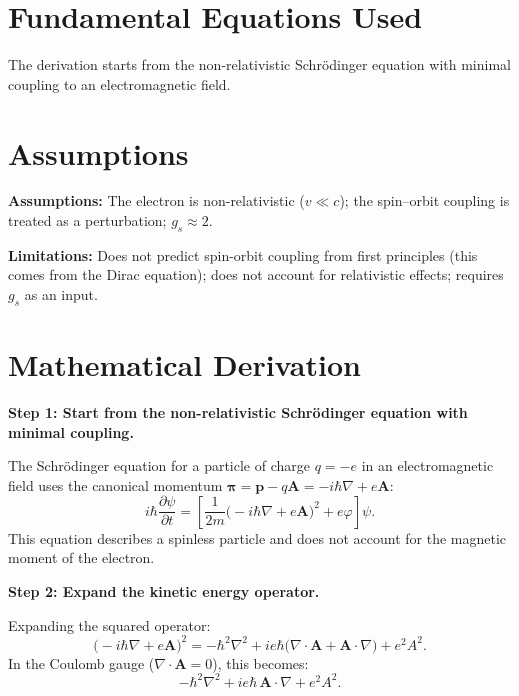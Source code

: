 \section*{Fundamental Equations Used}

The derivation starts from the non-relativistic Schr\"odinger equation with minimal coupling to an electromagnetic field.

\section*{Assumptions}

\textbf{Assumptions:} The electron is non-relativistic ($v \ll c$); the spin--orbit coupling is treated as a perturbation; $g_{s} \approx 2$.


\textbf{Limitations:} Does not predict spin-orbit coupling from first principles (this comes from the Dirac equation); does not account for relativistic effects; requires $g_{s}$ as an input.


\section*{Mathematical Derivation}

\textbf{Step 1: Start from the non-relativistic Schr\"odinger equation with minimal coupling.}

The Schr\"odinger equation for a particle of charge $q = -e$ in an electromagnetic field uses the canonical momentum $\boldsymbol{\pi} = \mathbf{p} - q\mathbf{A} = -i\hbar\nabla + e\mathbf{A}$:
\begin{equation}
i\hbar\frac{\partial\psi}{\partial t} = \left[\frac{1}{2m}\bigl(-i\hbar\nabla + e\mathbf{A}\bigr)^{2} + e\varphi\right]\psi.
\end{equation}
This equation describes a spinless particle and does not account for the magnetic moment of the electron.

\textbf{Step 2: Expand the kinetic energy operator.}

Expanding the squared operator:
\begin{equation}
\bigl(-i\hbar\nabla + e\mathbf{A}\bigr)^{2} = -\hbar^{2}\nabla^{2} + ie\hbar\bigl(\nabla\cdot\mathbf{A} + \mathbf{A}\cdot\nabla\bigr) + e^{2}A^{2}.
\end{equation}
In the Coulomb gauge ($\nabla\cdot\mathbf{A} = 0$), this becomes:
\begin{equation}
-\hbar^{2}\nabla^{2} + ie\hbar\,\mathbf{A}\cdot\nabla + e^{2}A^{2}.
\end{equation}


